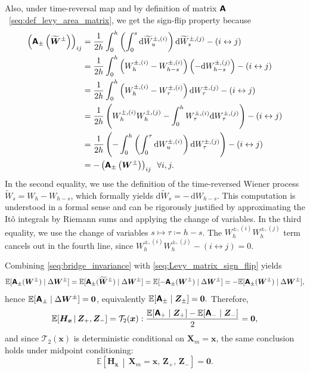 Also, under time-reversal map and by definition of matrix $\boldsymbol{\mathsf{A}}$~\eqref{seq:def_levy_area_matrix}, we get the sign-flip property because
\begin{equation}
    \begin{aligned}
        \left(\boldsymbol{\mathsf{A}}_\pm\left(\widetilde{\bm{W}}^\pm\right)\right)_{ij}
    &=\frac{1}{2h}\int_0^h\left(
    \int_0^s \mathrm{d}\widetilde{W}^{\pm,(i)}_u
    \right)\mathrm{d}\widetilde{W}^{\pm,(j)}_s
    -(i\leftrightarrow j)
    \\
    &=\frac{1}{2h}\int_0^h\left(
    W_h^{\pm,(i)}-W_{h-s}^{\pm,(i)}
    \right)\left(
    -\mathrm{d}W_{h-s}^{\pm,(j)}\right)
    -(i\leftrightarrow j)
    \\
    &=\frac{1}{2h}\int_0^h\left(
    W_h^{\pm,(i)}-W_\tau^{\pm,(i)}
    \right)
    \mathrm{d}W_\tau^{\pm,(j)}
    -(i\leftrightarrow j)
    \\
    &=\frac{1}{2h}\left(W_h^{\pm,(i)}W_h^{\pm,(j)}-\int_0^h
    W_\tau^{\pm,(i)}\mathrm{d}W_\tau^{\pm,(j)}\right)
    -(i\leftrightarrow j)
    \\
    &=\frac{1}{2h}\left(-
    \int_0^h\left(\int_0^\tau
    \mathrm{d}W_u^{\pm,(i)}
    \right)\mathrm{d}W_\tau^{\pm,(j)}
    \right)-(i\leftrightarrow j)
    \\
    &=-\left(\boldsymbol{\mathsf{A}}_\pm\left(\bm{W}^\pm\right)\right)_{ij} \,\,\,\forall i,j.
    \end{aligned}
    \label{seq:Levy_matrix_sign_flip}
\end{equation}
In the second equality, we use the definition of the time-reversed Wiener
process \(\widetilde W_s = W_h - W_{h-s}\), which formally yields
\(\mathrm{d}\widetilde W_s = -\,\mathrm{d}W_{h-s}\).
This computation is understood in a formal sense and can be rigorously
justified by approximating the It\^{o} integrals by Riemann sums and applying the change of variables.
In the third equality, we use the change of variables
\(s \mapsto \tau \coloneq h-s\). The $W_h^{\pm,(i)}W_h^{\pm,(j)}$ term cancels out in the fourth line, since $W_h^{\pm,(i)}W_h^{\pm,(j)}-(i\leftrightarrow j)=0$.

Combining \eqref{seq:bridge_invariance} with \eqref{seq:Levy_matrix_sign_flip} yields
\[
\mathbb E[\boldsymbol{\mathsf{A}}_\pm(\bm W^\pm)\mid \Delta\bm W^\pm]
=\mathbb E[\boldsymbol{\mathsf{A}}_\pm(\widetilde{\bm W}^\pm)\mid \Delta\bm W^\pm]
=\mathbb E[-\boldsymbol{\mathsf{A}}_\pm(\bm W^\pm)\mid \Delta\bm W^\pm]
=-\mathbb E[\boldsymbol{\mathsf{A}}_\pm(\bm W^\pm)\mid \Delta\bm W^\pm],
\]
hence $\mathbb E[\boldsymbol{\mathsf{A}}_\pm\mid \Delta\bm W^\pm]=\bm 0$, equivalently $\mathbb E[\boldsymbol{\mathsf{A}}_\pm\mid \bm Z_\pm]=\bm 0.$ 
Therefore,
\begin{equation*}
    \mathbb{E}\!\left[
    \bm{H}_{\bm{x}}\,\middle|\,\bm{Z}_+,\bm{Z}_-\right]
    = \mathcal{T}_2(\bm x):
    \frac{\mathbb E[\boldsymbol{\mathsf{A}}_+\mid \bm Z_+]-\mathbb E[\boldsymbol{\mathsf{A}}_-\mid \bm Z_-]}{2}=\bm 0,
\end{equation*}
and since $\mathcal T_2(\bm x)$ is deterministic conditional on $\bm X_m=\bm x$, the same conclusion holds under midpoint conditioning:
\begin{equation}
    \mathbb E\!\left[\bm H_{\bm x}\,\middle|\,\bm X_m=\bm x,\,\bm Z_+,\,\bm Z_-\right]=\bm 0.
    \label{seq:H_cond_mean_zero}
\end{equation}

